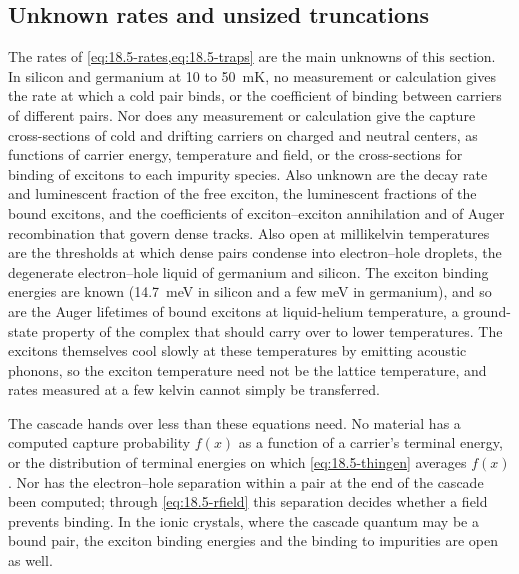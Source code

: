 \subsection{Unknown rates and unsized truncations}\label{sec:18.5-open}

The rates of \cref{eq:18.5-rates,eq:18.5-traps} are the main unknowns of this section. In silicon and germanium at 10 to \SI{50}{mK}, no measurement or calculation gives the rate at which a cold pair binds, or the coefficient of binding between carriers of different pairs. Nor does any measurement or calculation give the capture cross-sections of cold and drifting carriers on charged and neutral centers, as functions of carrier energy, temperature and field, or the cross-sections for binding of excitons to each impurity species. Also unknown are the decay rate and luminescent fraction of the free exciton, the luminescent fractions of the bound excitons, and the coefficients of exciton--exciton annihilation and of Auger recombination that govern dense tracks. Also open at millikelvin temperatures are the thresholds at which dense pairs condense into electron--hole droplets, the degenerate electron--hole liquid of germanium and silicon. The exciton binding energies are known (\SI{14.7}{meV} in silicon and a few meV in germanium), and so are the Auger lifetimes of bound excitons at liquid-helium temperature, a ground-state property of the complex that should carry over to lower temperatures. The excitons themselves cool slowly at these temperatures by emitting acoustic phonons, so the exciton temperature need not be the lattice temperature, and rates measured at a few kelvin cannot simply be transferred.

The cascade hands over less than these equations need. No material has a computed capture probability $f(x)$ as a function of a carrier's terminal energy, or the distribution of terminal energies on which \cref{eq:18.5-thingen} averages $f(x)$. Nor has the electron--hole separation within a pair at the end of the cascade been computed; through \cref{eq:18.5-rfield} this separation decides whether a field prevents binding. In the ionic crystals, where the cascade quantum may be a bound pair, the exciton binding energies and the binding to impurities are open as well.

